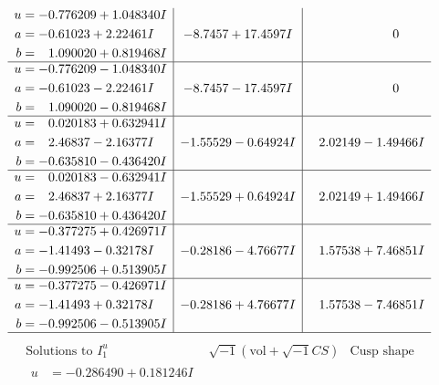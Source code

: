\documentclass[1p]{elsarticle_modified}
\theoremstyle{definition}
\newcommand{\I}{\sqrt{-1}}
\begin{document}
$$\begin{array}{c|c|c}
\begin{aligned}
u &= -0.776209 + 1.048340 I \\
a &= -0.61023 + 2.22461 I \\
b &= \phantom{-}1.090020 + 0.819468 I\end{aligned}
 & -8.7457 + 17.4597 I & \phantom{-0.000000 } 0 \\ \hline\begin{aligned}
u &= -0.776209 - 1.048340 I \\
a &= -0.61023 - 2.22461 I \\
b &= \phantom{-}1.090020 - 0.819468 I\end{aligned}
 & -8.7457 - 17.4597 I & \phantom{-0.000000 } 0 \\ \hline\begin{aligned}
u &= \phantom{-}0.020183 + 0.632941 I \\
a &= \phantom{-}2.46837 - 2.16377 I \\
b &= -0.635810 - 0.436420 I\end{aligned}
 & -1.55529 - 0.64924 I & \phantom{-}2.02149 - 1.49466 I \\ \hline\begin{aligned}
u &= \phantom{-}0.020183 - 0.632941 I \\
a &= \phantom{-}2.46837 + 2.16377 I \\
b &= -0.635810 + 0.436420 I\end{aligned}
 & -1.55529 + 0.64924 I & \phantom{-}2.02149 + 1.49466 I \\ \hline\begin{aligned}
u &= -0.377275 + 0.426971 I \\
a &= -1.41493 - 0.32178 I \\
b &= -0.992506 + 0.513905 I\end{aligned}
 & -0.28186 - 4.76677 I & \phantom{-}1.57538 + 7.46851 I \\ \hline\begin{aligned}
u &= -0.377275 - 0.426971 I \\
a &= -1.41493 + 0.32178 I \\
b &= -0.992506 - 0.513905 I\end{aligned}
 & -0.28186 + 4.76677 I & \phantom{-}1.57538 - 7.46851 I\\
 \hline 
 \end{array}$$\newpage$$\begin{array}{c|c|c}  
\text{Solutions to }I^u_{1}& \I (\text{vol} + \sqrt{-1}CS) & \text{Cusp shape}\\
 \hline 
\begin{aligned}
u &= -0.286490 + 0.181246 I \\

\end{aligned}
\end{array}$$
\end{document}
